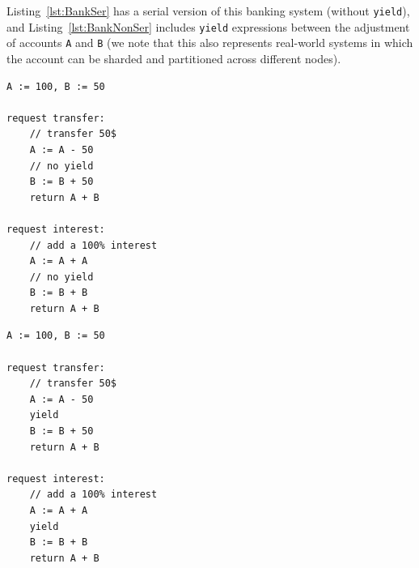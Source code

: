 Listing~\ref{lst:BankSer} has a serial version of this banking system (without \texttt{yield}), and Listing~\ref{lst:BankNonSer} includes \texttt{yield} expressions between the adjustment of accounts \texttt{A} and \texttt{B} (we note that this also represents real-world systems in which the account can be sharded and partitioned across different nodes).
%


\noindent
\begin{minipage}[t]{0.45\textwidth}
	\begin{lstlisting}[caption={Serializable},
		label={lst:BankSer},numbers=none]
A := 100, B := 50

request transfer: 
    // transfer 50$
    A := A - 50
    // no yield
    B := B + 50
    return A + B
	
request interest: 
    // add a 100% interest
    A := A + A
    // no yield
    B := B + B
    return A + B      
			\end{lstlisting}
\end{minipage}
\hfill
\begin{minipage}[t]{0.45\textwidth}
	\begin{lstlisting}[caption={Not serializable},
		label={lst:BankNonSer},numbers=none]
A := 100, B := 50
	
request transfer: 
    // transfer 50$
    A := A - 50
    yield
    B := B + 50
    return A + B

request interest: 
    // add a 100% interest
    A := A + A
    yield
    B := B + B
    return A + B
      		\end{lstlisting}
\end{minipage}
	

